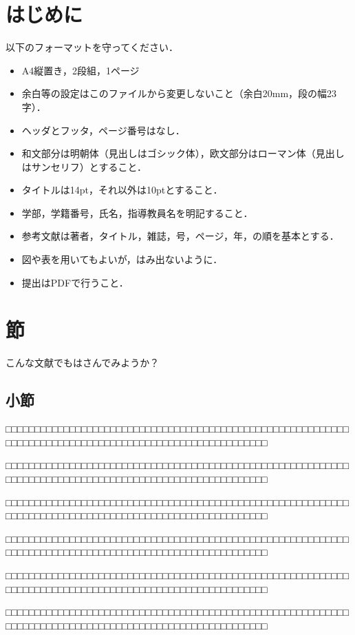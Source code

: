 

\section{はじめに}
以下のフォーマットを守ってください．
\begin{itemize}
\item A4縦置き，2段組，1ページ
\item
余白等の設定はこのファイルから変更しないこと（余白20mm，段の幅23字）．
\item ヘッダとフッタ，ページ番号はなし．
\item 和文部分は明朝体（見出しはゴシック体），欧文部分はローマン体（見出しはサンセリフ）とすること．
\item タイトルは14pt，それ以外は10ptとすること．
\item 学部，学籍番号，氏名，指導教員名を明記すること．
\item 参考文献は著者，タイトル，雑誌，号，ページ，年，の順を基本とする．
\item 図や表を用いてもよいが，はみ出ないように．
\item 提出はPDFで行うこと．
\end{itemize}
\section{節}
こんな文献でもはさんでみようか\cite{gisiwazinden}？
\subsection{小節}

□□□□□□□□□□□□□□□□□□□□□□□□□□□□□□□□□□□□□□□□□□□□□□□□□□□□□□□□□□□□□□□□□□□□□□□□□□□□□□□□□□□□□□□□□□□□□□□□□□□□□□□□

□□□□□□□□□□□□□□□□□□□□□□□□□□□□□□□□□□□□□□□□□□□□□□□□□□□□□□□□□□□□□□□□□□□□□□□□□□□□□□□□□□□□□□□□□□□□□□□□□□□□□□□□

□□□□□□□□□□□□□□□□□□□□□□□□□□□□□□□□□□□□□□□□□□□□□□□□□□□□□□□□□□□□□□□□□□□□□□□□□□□□□□□□□□□□□□□□□□□□□□□□□□□□□□□□

□□□□□□□□□□□□□□□□□□□□□□□□□□□□□□□□□□□□□□□□□□□□□□□□□□□□□□□□□□□□□□□□□□□□□□□□□□□□□□□□□□□□□□□□□□□□□□□□□□□□□□□□

□□□□□□□□□□□□□□□□□□□□□□□□□□□□□□□□□□□□□□□□□□□□□□□□□□□□□□□□□□□□□□□□□□□□□□□□□□□□□□□□□□□□□□□□□□□□□□□□□□□□□□□□

□□□□□□□□□□□□□□□□□□□□□□□□□□□□□□□□□□□□□□□□□□□□□□□□□□□□□□□□□□□□□□□□□□□□□□□□□□□□□□□□□□□□□□□□□□□□□□□□□□□□□□□□

